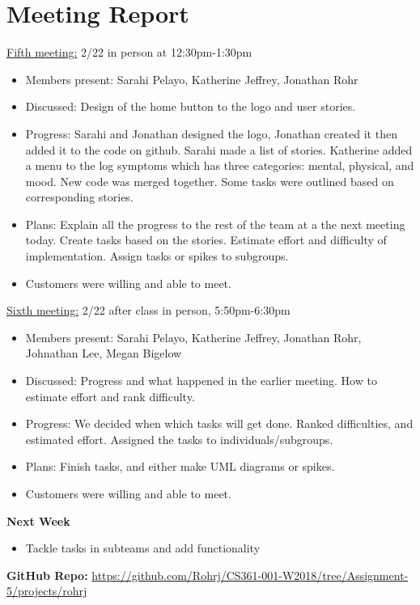 \documentclass[letterpaper,12pt,titlepage]{article}
\begin{document}
\section{Meeting Report}
\underline{Fifth meeting:} 2/22 in person at 12:30pm-1:30pm
\begin{itemize}
\item Members present: Sarahi Pelayo, Katherine Jeffrey, Jonathan Rohr
\item Discussed: Design of the home button to the logo and user stories.
\item Progress: Sarahi and Jonathan designed the logo, Jonathan created it then added it to the code on github. Sarahi made a list of stories. Katherine added a menu to the log symptoms which has three categories: mental, physical, and mood. New code was merged together. Some tasks were outlined based on corresponding stories.
\item Plans: Explain all the progress to the rest of the team at a the next meeting today. Create tasks based on the stories. Estimate effort and difficulty of implementation. Assign tasks or spikes to subgroups.
\item Customers were willing and able to meet.
\end{itemize}
\noindent
\underline{Sixth meeting:} 2/22 after class in person, 5:50pm-6:30pm
\begin{itemize}
\item Members present: Sarahi Pelayo, Katherine Jeffrey, Jonathan Rohr, Johnathan Lee, Megan Bigelow
\item Discussed: Progress and what happened in the earlier meeting. How to estimate effort and rank difficulty. 
\item Progress: We decided when which tasks will get done. Ranked difficulties, and estimated effort. Assigned the tasks to individuals/subgroups.
\item Plans: Finish tasks, and either make UML diagrams or spikes.
\item Customers were willing and able to meet.
\end{itemize}
\textbf{Next Week}
\begin{itemize}
\item Tackle tasks in subteams and add functionality
\end{itemize}
\newpage



\textbf{GitHub Repo:} \url{https://github.com/Rohrj/CS361-001-W2018/tree/Assignment-5/projects/rohrj}
\end{document}
